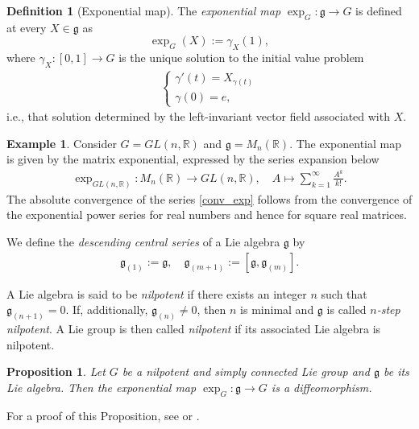 \documentclass[12pt,oneside,a4paper]{book}
\numberwithin{equation}{section}     %
\theoremstyle{plain}
\newtheorem{proposition}[theorem]{Proposition}
\theoremstyle{definition}
\newtheorem{definition}[theorem]{Definition}
\newtheorem{example}[theorem]{Example}
\newcommand{\R}{{\mathbb R}}
\begin{document}
\begin{definition}[Exponential map]
	The \textit{exponential map} $\exp_G: \mathfrak{g}\rightarrow G$ is defined at every $X\in\mathfrak{g}$ as
	\[
	\exp_{G}(X):=\gamma_{X}(1),
	\]
	where $\gamma_X:[0,1]\rightarrow G$ is the unique solution to the initial value problem
	\begin{align*}
	\begin{cases}
	\gamma'(t)=X_{\gamma(t)}\\
	\gamma(0)=e,
	\end{cases}
	\end{align*}
	i.e., that solution determined by the left-invariant vector field associated with $X$.
\end{definition}

\begin{example}
	Consider $G=GL(n,\R)$ and $\mathfrak{g}=M_n(\R)$. The exponential map is given by the matrix exponential, expressed by the series expansion below  
	\begin{align}\label{conv_exp}
	\exp_{GL(n,\R)}:M_n(\R)\rightarrow GL(n,\R),\quad A\mapsto\sum_{k=1}^{\infty}\frac{A^k}{k!}.
	\end{align}
	The absolute convergence of the series \eqref{conv_exp} follows from the convergence of the exponential power series for real numbers and hence for square real matrices.
\end{example}

We define the \textit{descending central series} of a Lie algebra $\mathfrak{g}$ by
\begin{align*}
\mathfrak{g}_{(1)}:=\mathfrak{g},\quad \mathfrak{g}_{(m+1)}:=[\mathfrak{g},\mathfrak{g}_{(m)}].
\end{align*}

A Lie algebra is said to be \textit{nilpotent} if there exists an integer $n$ such that $\mathfrak{g}_{(n+1)}=0$. If, additionally, $\mathfrak{g}_{(n)}\neq 0$, then $n$ is minimal and $\mathfrak{g}$ is called \textit{$n$-step nilpotent}.  A Lie group is then called \textit{nilpotent} if its associated Lie algebra is nilpotent.

\begin{proposition}
	Let $G$ be a nilpotent and simply connected Lie group and $\mathfrak{g}$ be its Lie algebra. Then the exponential map $\exp_G:\mathfrak{g}\rightarrow G$ is a diffeomorphism.
\end{proposition}

For a proof of this Proposition, see \cite[Theorem 1.2.1]{CG90} or \cite[Proposition 1.2]{FS}.
\end{document}

